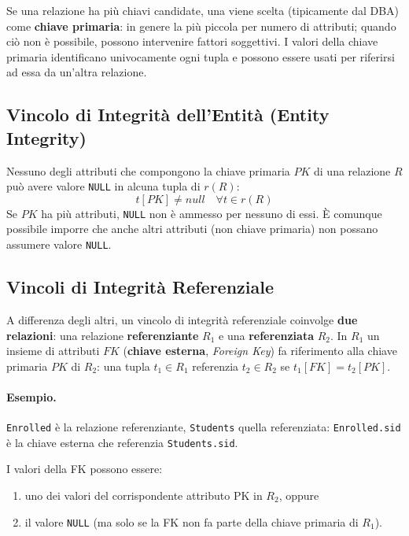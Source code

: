 \documentclass[12pt, a4paper]{article}
\begin{document}
Se una relazione ha più chiavi candidate, una viene scelta (tipicamente dal DBA) come \textbf{chiave primaria}: in genere la più piccola per numero di attributi; quando ciò non è possibile, possono intervenire fattori soggettivi. I valori della chiave primaria identificano univocamente ogni tupla e possono essere usati per riferirsi ad essa da un'altra relazione.

\subsection{Vincolo di Integrità dell'Entità (Entity Integrity)}

Nessuno degli attributi che compongono la chiave primaria $PK$ di una relazione $R$ può avere valore \texttt{NULL} in alcuna tupla di $r(R)$:
$$t[PK] \neq null \quad \forall t \in r(R)$$
Se $PK$ ha più attributi, \texttt{NULL} non è ammesso per nessuno di essi. È comunque possibile imporre che anche altri attributi (non chiave primaria) non possano assumere valore \texttt{NULL}.

\subsection{Vincoli di Integrità Referenziale}

A differenza degli altri, un vincolo di integrità referenziale coinvolge \textbf{due relazioni}: una relazione \textbf{referenziante} $R_1$ e una \textbf{referenziata} $R_2$. In $R_1$ un insieme di attributi $FK$ (\textbf{chiave esterna}, \textit{Foreign Key}) fa riferimento alla chiave primaria $PK$ di $R_2$: una tupla $t_1 \in R_1$ referenzia $t_2 \in R_2$ se $t_1[FK] = t_2[PK]$.

\paragraph{Esempio.} \texttt{Enrolled} è la relazione referenziante, \texttt{Students} quella referenziata: \texttt{Enrolled.sid} è la chiave esterna che referenzia \texttt{Students.sid}.

I valori della FK possono essere:
\begin{enumerate}
    \item uno dei valori del corrispondente attributo PK in $R_2$, oppure
    \item il valore \texttt{NULL} (ma solo se la FK non fa parte della chiave primaria di $R_1$).
\end{enumerate}
\end{document}
